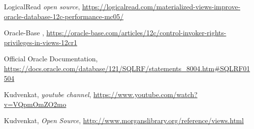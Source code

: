 \begin{thebibliography}{99999}
\singlespace\normalsize

 LogicalRead\textit{ open source}, \url{https://logicalread.com/materialized-views-improve-oracle-database-12c-performance-mc05/}

 Oracle-Base  ,
\url{https://oracle-base.com/articles/12c/control-invoker-rights-privileges-in-views-12cr1}

 Official Oracle Documentation,  \url{https://docs.oracle.com/database/121/SQLRF/statements_8004.htm#SQLRF01504}

 Kudvenkat, \textit{youtube channel}, \url{https://www.youtube.com/watch?v=VQpmOmZO2mo}

 Kudvenkat, \textit{Open Source}, \url{http://www.morganslibrary.org/reference/views.html}


\end{thebibliography}
